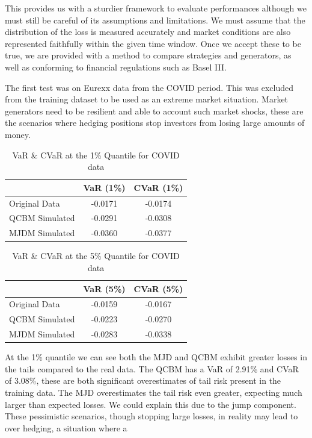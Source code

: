 \documentclass[12pt]{article}
\newcommand{\newp}
    {
    \vskip 0.5cm 
  }
\numberwithin{equation}{section}
\begin{document}
This provides us with a sturdier framework to evaluate performances although we 
must still be careful of its assumptions and limitations. We must assume that the 
distribution of the loss is measured accurately and market conditions are also 
represented faithfully within the given time window. Once we accept these to be 
true, we are provided with a method to compare strategies and generators, as well 
as conforming to financial regulations such as Basel III.
\newp 
The first test was on Eurexx data from the COVID period. This was excluded from the training 
dataset to be used as an extreme market situation. Market generators need to be 
resilient and able to account such market shocks, these are the scenarios where 
hedging positions stop investors from losing large amounts of money.
\begin{table}[h!]
\centering
\begin{tabular}{lcc}
\hline
\textbf{} & \textbf{VaR (1\%)} & \textbf{CVaR (1\%)} \\
\hline
Original Data     & -0.0171 & -0.0174 \\
QCBM Simulated    & -0.0291 & -0.0308 \\
MJDM Simulated    & -0.0360 & -0.0377 \\
\hline
\end{tabular}
\caption{VaR \& CVaR at the 1\% Quantile for COVID data}
\label{tab:cvar_1}
\end{table}
\begin{table}[h!]
\centering
\begin{tabular}{lcc}
\hline
\textbf{} & \textbf{VaR (5\%)} & \textbf{CVaR (5\%)} \\
\hline
Original Data     & -0.0159 & -0.0167 \\
QCBM Simulated    & -0.0223 & -0.0270 \\
MJDM Simulated    & -0.0283 & -0.0338 \\
\hline
\end{tabular}
\caption{VaR \& CVaR at the 5\% Quantile for COVID data}
\label{tab:cvar_5}
\end{table}
At the 1\% quantile we can see both
the MJD and QCBM exhibit greater losses in the tails compared to the real data.
The QCBM has a VaR of 2.91\% and CVaR of 3.08\%, these are both significant 
overestimates of tail risk present in the training data. The MJD overestimates 
the tail risk even greater, expecting much larger than expected losses. We could 
explain this due to the jump component. These pessimistic scenarios, though 
stopping large losses, in reality may lead to over hedging, a situation where a 
\end{document}
